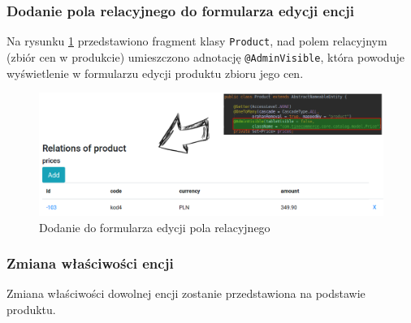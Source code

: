 \subsubsection{Dodanie pola relacyjnego do formularza edycji encji}
Na rysunku \ref{relacjarys} przedstawiono fragment klasy \texttt{Product}, nad polem relacyjnym (zbiór cen w produkcie) umieszczono adnotację \texttt{@AdminVisible}, która powoduje wyświetlenie w formularzu edycji produktu zbioru jego cen.
\begin{figure}
	\begin{center}
		\includegraphics[scale=0.4]{relacjeWDFE.png}
	\end{center}
	\caption{{\color{black}Dodanie do formularza edycji pola relacyjnego}} \label{relacjarys}
\end{figure}

\subsubsection{Zmiana właściwości encji} 
Zmiana właściwości dowolnej encji zostanie przedstawiona na podstawie produktu.
 
